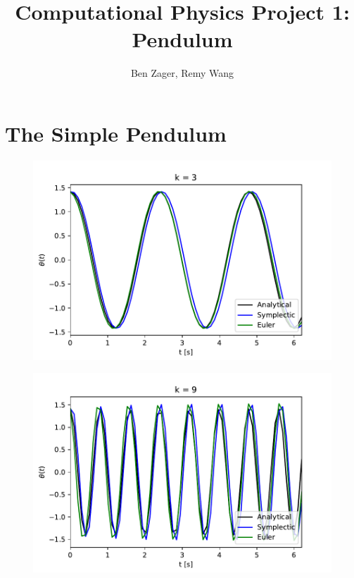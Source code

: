 \documentclass[12pt]{article}
\begin{document}
  
\title{Computational Physics Project 1: Pendulum}
\author{Ben Zager, Remy Wang}
\maketitle
 
\section*{The Simple Pendulum}
 
\noindent
\begin{figure}[ht!]
	\centering
	\begin{minipage}[b]{0.4\textwidth}
	  \includegraphics[scale=0.6]{../figures/k3_nonlin.pdf}
		\label{phaseDot}
	\end{minipage}
	\hfill
	\begin{minipage}[b]{0.4\textwidth}
	  \includegraphics[scale=0.6]{../figures/k9_nonlin.pdf}

\end{minipage}
\end{figure}
\end{document}
